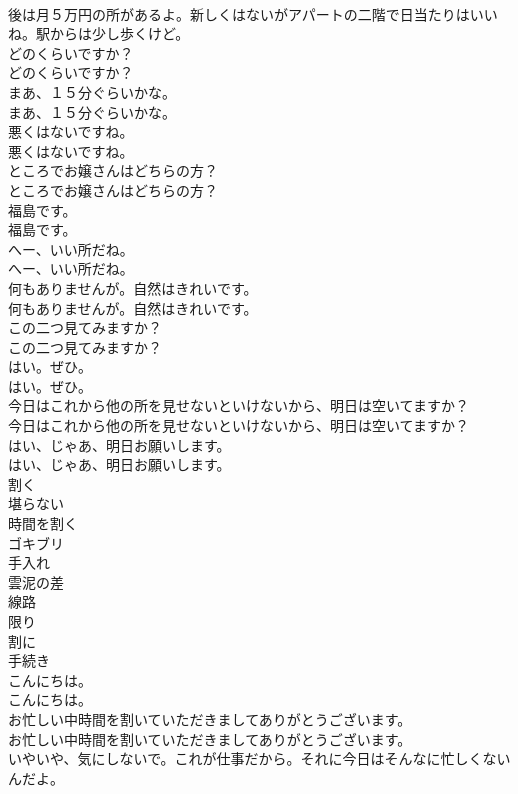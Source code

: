 \documentclass[8pt]{extreport}
\begin{document}
\begin{CJK}{UTF8}{min}
\\	後は月５万円の所があるよ。新しくはないがアパートの二階で日当たりはいいね。駅からは少し歩くけど。 
\\	どのくらいですか？	
\\	どのくらいですか？ 
\\	まあ、１５分ぐらいかな。	
\\	まあ、１５分ぐらいかな。 
\\	悪くはないですね。	
\\	悪くはないですね。 
\\	ところでお嬢さんはどちらの方？	
\\	ところでお嬢さんはどちらの方？ 
\\	福島です。	
\\	福島です。 
\\	へー、いい所だね。	
\\	へー、いい所だね。 
\\	何もありませんが。自然はきれいです。	
\\	何もありませんが。自然はきれいです。 
\\	この二つ見てみますか？	
\\	この二つ見てみますか？ 
\\	はい。ぜひ。	
\\	はい。ぜひ。 
\\	今日はこれから他の所を見せないといけないから、明日は空いてますか？	
\\	今日はこれから他の所を見せないといけないから、明日は空いてますか？ 
\\	はい、じゃあ、明日お願いします。	
\\	はい、じゃあ、明日お願いします。 
\\	割く
\\	堪らない
\\	時間を割く
\\	ゴキブリ
\\	手入れ
\\	雲泥の差
\\	線路
\\	限り
\\	割に
\\	手続き
\\	こんにちは。	
\\	こんにちは。 
\\	お忙しい中時間を割いていただきましてありがとうございます。	
\\	お忙しい中時間を割いていただきましてありがとうございます。 
\\	いやいや、気にしないで。これが仕事だから。それに今日はそんなに忙しくないんだよ。	

\end{CJK}
\end{document}
